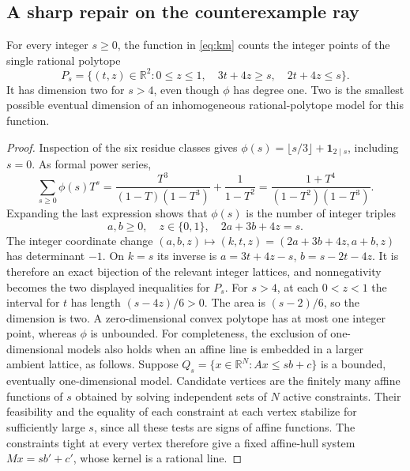 \subsection{A sharp repair on the counterexample ray}

\begin{proposition}
\label{prop:shiftedray}
For every integer $s\ge0$, the function in \eqref{eq:km} counts the integer
points of the single rational polytope
\[
 P_s=\{(t,z)\in\mathbb R^2:
 0\le z\le1,\quad 3t+4z\ge s,\quad 2t+4z\le s\}.
 \tag{P-F1}
\]
It has dimension two for $s>4$, even though $\phi$ has degree one.
Two is the smallest possible eventual dimension of an inhomogeneous
rational-polytope model for this function.
\end{proposition}
\begin{proof}
Inspection of the six residue classes gives
$\phi(s)=\lfloor s/3\rfloor+\mathbf1_{2\mid s}$, including $s=0$.
As formal power series,
\[
 \sum_{s\ge0}\phi(s)T^s
 =\frac{T^3}{(1-T)(1-T^3)}+\frac1{1-T^2}
 =\frac{1+T^4}{(1-T^2)(1-T^3)}.
\]
Expanding the last expression shows that $\phi(s)$ is the number of
integer triples
\[
 a,b\ge0,\quad z\in\{0,1\},\quad 2a+3b+4z=s.
\]
The integer coordinate change
$(a,b,z)\mapsto(k,t,z)=(2a+3b+4z,a+b,z)$ has determinant $-1$.
On $k=s$ its inverse is
$a=3t+4z-s$, $b=s-2t-4z$.
It is therefore an exact bijection of the relevant integer lattices,
and nonnegativity becomes the two displayed inequalities for $P_s$.
For $s>4$, at each $0<z<1$ the interval for $t$ has length
$(s-4z)/6>0$. The area is $(s-2)/6$, so the dimension is two.
A zero-dimensional convex polytope has at most one integer point,
whereas $\phi$ is unbounded. For completeness, the exclusion of
one-dimensional models also holds when an affine line is embedded in
a larger ambient lattice, as follows. Suppose
$Q_s=\{x\in\mathbb R^N:Ax\le sb+c\}$ is a bounded, eventually
one-dimensional model. Candidate vertices are the finitely many affine
functions of $s$ obtained by solving independent sets of $N$ active
constraints. Their feasibility and the equality of each constraint at
each vertex stabilize for sufficiently large $s$, since all these tests
are signs of affine functions. The constraints tight at every vertex
therefore give a fixed affine-hull system $Mx=sb'+c'$, whose kernel is
a rational line.


\end{proof}
